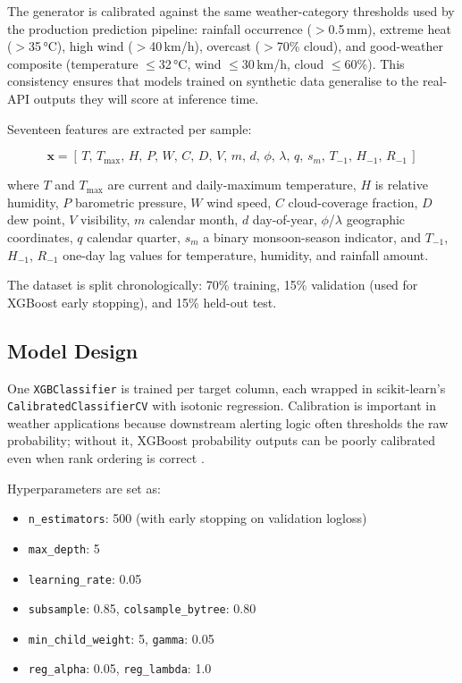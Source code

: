 \documentclass[conference]{IEEEtran}
\begin{document}
The generator is calibrated against the same weather-category thresholds used by the production prediction pipeline: rainfall occurrence ($>$0.5\,mm), extreme heat ($>$35\,°C), high wind ($>$40\,km/h), overcast ($>$70\% cloud), and good-weather composite (temperature $\leq$32\,°C, wind $\leq$30\,km/h, cloud $\leq$60\%). This consistency ensures that models trained on synthetic data generalise to the real-API outputs they will score at inference time.

Seventeen features are extracted per sample:

\begin{equation}
\mathbf{x} = [\,T,\,T_{\max},\,H,\,P,\,W,\,C,\,D,\,V,\,m,\,d,\,\phi,\,\lambda,\,q,\,s_m,\,T_{-1},\,H_{-1},\,R_{-1}\,]
\label{eq:features}
\end{equation}

\noindent where $T$ and $T_{\max}$ are current and daily-maximum temperature, $H$ is relative humidity, $P$ barometric pressure, $W$ wind speed, $C$ cloud-coverage fraction, $D$ dew point, $V$ visibility, $m$ calendar month, $d$ day-of-year, $\phi$/$\lambda$ geographic coordinates, $q$ calendar quarter, $s_m$ a binary monsoon-season indicator, and $T_{-1}$, $H_{-1}$, $R_{-1}$ one-day lag values for temperature, humidity, and rainfall amount.

The dataset is split chronologically: 70\% training, 15\% validation (used for XGBoost early stopping), and 15\% held-out test.

\subsection{Model Design}

One \texttt{XGBClassifier} is trained per target column, each wrapped in scikit-learn's \texttt{CalibratedClassifierCV} with isotonic regression. Calibration is important in weather applications because downstream alerting logic often thresholds the raw probability; without it, XGBoost probability outputs can be poorly calibrated even when rank ordering is correct \cite{niculescu2005}.

Hyperparameters are set as:
\begin{itemize}
    \item \texttt{n\_estimators}: 500 (with early stopping on validation logloss)
    \item \texttt{max\_depth}: 5
    \item \texttt{learning\_rate}: 0.05
    \item \texttt{subsample}: 0.85, \texttt{colsample\_bytree}: 0.80
    \item \texttt{min\_child\_weight}: 5, \texttt{gamma}: 0.05
    \item \texttt{reg\_alpha}: 0.05, \texttt{reg\_lambda}: 1.0
\end{itemize}
\end{document}
